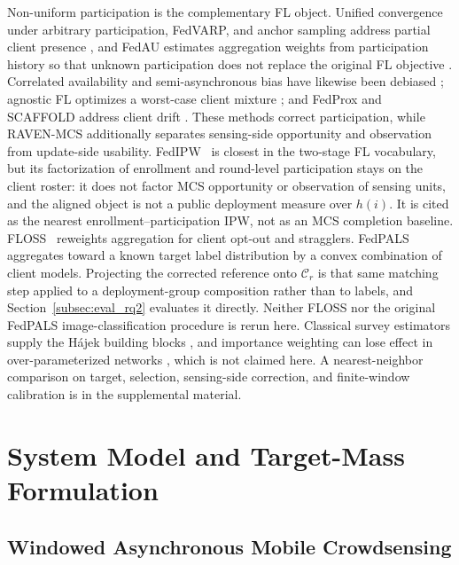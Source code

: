 \documentclass[letterpaper,journal]{IEEEtran}
\begin{document}
Non-uniform participation is the complementary FL object.  Unified convergence
under arbitrary participation, FedVARP, and anchor sampling address partial
client presence \cite{wang2022unified,jhunjhunwala2022fedvarp,wu2023anchor}, and
FedAU estimates aggregation weights from participation history so that unknown
participation does not replace the original FL objective
\cite{wang2024lightweight}.  Correlated availability and semi-asynchronous
bias have likewise been debiased
\cite{sun2025debiasing,chen2026fedcure}; agnostic FL optimizes a worst-case
client mixture \cite{mohri2019agnostic}; and FedProx and SCAFFOLD address client
drift \cite{li2020fedprox,karimireddy2020scaffold}.  These methods correct
participation, while RAVEN-MCS additionally separates sensing-side opportunity
and observation from update-side usability.  FedIPW~\cite{morishita2026who} is
closest in the two-stage FL vocabulary, but its factorization of enrollment and
round-level participation stays on the client roster: it does not factor MCS
opportunity or observation of sensing units, and the aligned object is not a
public deployment measure over $h(i)$.  It is cited as the nearest
enrollment--participation IPW, not as an MCS completion baseline.
FLOSS~\cite{goetze2025floss} reweights aggregation for client
opt-out and stragglers.  FedPALS~\cite{listozec2024overcoming} aggregates toward
a known target label distribution by a convex combination of client models.
Projecting the corrected reference onto $\mathcal{C}_r$ is that same matching
step applied to a deployment-group composition rather than to labels, and
Section~\ref{subsec:eval_rq2} evaluates it directly.  Neither FLOSS
nor the original FedPALS image-classification procedure is rerun here.
Classical survey estimators supply the H\'ajek building blocks
\cite{horvitz1952generalization,hajek1971comment,shimodaira2000covariate,robins1994estimation},
and importance weighting can lose effect in over-parameterized networks
\cite{byrd2019importance}, which is not claimed here.  A nearest-neighbor
comparison on target, selection, sensing-side correction, and finite-window
calibration is in the supplemental material.


\section{System Model and Target-Mass Formulation}
\label{sec:system_model}

\subsection{Windowed Asynchronous Mobile Crowdsensing}
\label{subsec:windowed_mcs}
\end{document}

